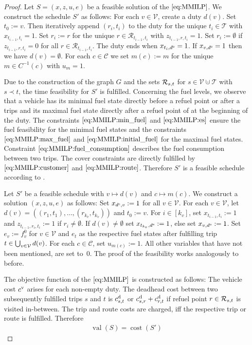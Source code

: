 \begin{proof}

Let ${S=(x,z,u,e)}$ be a feasible solution of the $\eqref{eq:MMILP}$. We construct the schedule $S'$ as follows: For each ${v\in\mathcal{V}}$, create a duty $d(v)$. Set ${t_0:=v}$. Then iteratively append $\left(r_i,t_i\right)$ to the duty for the unique ${t_i\in\mathcal{T}}$ with ${x_{t_{i-1},t_i}=1}$. Set ${r_i:=r}$ for the unique ${r\in\mathcal{R}_{t_{i-1},t_i}}$ with ${z_{t_{i-1},r,t_i}=1}$. Set ${r_i:=\emptyset}$ if ${z_{t_{i-1},r,t_i}=0}$ for all ${r\in\mathcal{R}_{t_{i-1},t_i}}$. The duty ends when ${x_{t_i,d^{\operatorname{e}}}=1}$. If ${x_{v,d^{\operatorname{e}}}=1}$ then we have ${d(v)=\emptyset}$. For each ${c\in\mathcal{C}}$ we set ${m(c):=m}$ for the unique ${m\in C^{-1}(c)}$ with ${u_m=1}$.

Due to the construction of the graph $G$ and the sets $\mathcal{R}_{s,t}$ for ${s\in\mathcal{V}\cupdot\mathcal{T}}$ with $s\prec t$, the time feasibility for $S'$ is fulfilled. Concerning the fuel levels, we observe that a vehicle has its minimal fuel state directly before a refuel point or after a trips and its maximal fuel state directly after a refuel point of at the beginning of the duty. The constraints $\eqref{eq:MMILP:min_fuel}$ and $\eqref{eq:MMILP:es}$ ensure the fuel feasibility for the minimal fuel states and the constraints $\eqref{eq:MMILP:max_fuel}$ and $\eqref{eq:MMILP:initial_fuel}$ for the maximal fuel states. Constraint $\eqref{eq:MMILP:fuel_consumption}$ describes the fuel consumption between two trips. The cover constraints are directly fulfilled by $\eqref{eq:MMILP:customer}$ and $\eqref{eq:MMILP:route}$. Therefore $S'$ is a feasible schedule according to .

Let $S'$ be a feasible schedule with $v\mapsto d(v)$ and $c\mapsto m(c)$. We construct a solution $(x,z,u,e)$ as follows: Set ${x_{d^{\operatorname{s}},v}:=1}$ for all ${v\in\mathcal{V}}$. For each ${v\in\mathcal{V}}$, let ${d(v)=\left(\left(r_1,t_1\right),\dots,\left(r_{k_v},t_{k_v}\right)\right)}$ and ${t_0:= v}$. For ${i\in\left[k_v\right]}$, set ${x_{t_{i-1},t_i}:=1}$ and ${z_{t_{i-1},r_i,t_i}:=1}$ if ${r_i\neq\emptyset}$. If ${d(v)\neq\emptyset}$ set ${x_{t_{k_v},d^{\operatorname{e}}}:=1}$, else set ${x_{v,d^{\operatorname{e}}}:=1}$. Set ${e_v:=f^0_v}$ for ${v\in\mathcal{V}}$ and $e_t$ as the respective fuel states after fulfilling trip ${t\in\bigcup_{v\in\mathcal{V}} d(v)}$. For each ${c\in\mathcal{C}}$, set ${u_{m(c)}:=1}$. All other variables that have not been mentioned, are set to~$0$. The proof of the feasibility works analogously to before.

The objective function of the $\eqref{eq:MMILP}$ is constructed as follows: The vehicle cost $c^{\operatorname{v}}$ arises for each non-empty duty. The deadhead cost between two subsequently fulfilled trips $s$ and $t$ is $c^{\operatorname{d}}_{s,t}$ or ${c^{\operatorname{d}}_{s,r}+c^{\operatorname{d}}_{r,t}}$ if refuel point ${r\in\mathcal{R}_{s,t}}$ is visited in-between. The trip and route costs are charged, iff the respective trip or route is fulfilled. Therefore
\begin{align*}
	\operatorname{val}(S) = \operatorname{cost}\left(S'\right)
\end{align*}

\end{proof}

